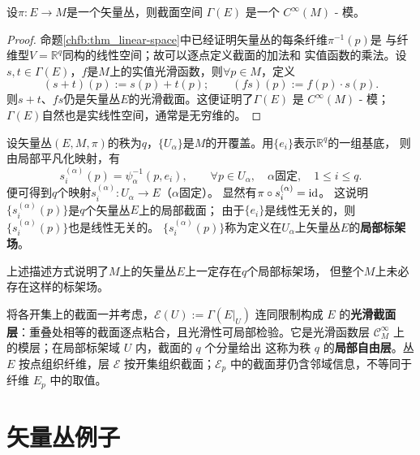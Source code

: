 \begin{proposition}
    设$\pi: E \rightarrow M$是一个矢量丛，则截面空间 $\Gamma(E)$ 是一个 $C^{\infty}(M)$ - 模。
\end{proposition}

\begin{proof}
    命题\ref{chfb:thm_linear-space}中已经证明矢量丛的每条纤维$\pi^{-1}(p)$是
    与纤维型$V = \mathbb{R}^q$同构的线性空间；故可以逐点定义截面的加法和
    实值函数的乘法。设$s,t\in \Gamma(E)$，$f$是$M$上的实值光滑函数，则$\forall p\in M$，定义
    \begin{equation}
        (s+t)(p):= s(p) + t(p);\qquad
        (fs)(p) := f(p) \cdot s(p) .
    \end{equation}
    则$s+t$、$fs$仍是矢量丛$E$的光滑截面。这便证明了$\Gamma(E)$ 是 $C^{\infty}(M)$ - 模；
    $\Gamma(E)$自然也是实线性空间，通常是无穷维的。
\end{proof}

设矢量丛$(E,M,\pi)$的秩为$q$，$\{U_\alpha\}$是$M$的开覆盖。用$\{e_i\}$表示$\mathbb{R}^q$的一组基底，
则由局部平凡化映射，有
\begin{equation}
    s_i^{(\alpha)}(p) = \psi^{-1}_{\alpha}(p, e_i),\qquad \forall p\in U_\alpha,
    \quad \alpha \text{固定}, \quad 1 \leqslant i \leqslant q.
\end{equation}
便可得到$q$个映射$s_i^{(\alpha)} : U_\alpha \to E$（$\alpha$固定）。
显然有$\pi \circ s_i^{(\alpha)} =\mathrm{id} $。
这说明$\{s_i^{(\alpha)}(p)\}$是$q$个矢量丛$E$上的局部截面；
由于$\{e_i\}$是线性无关的，则$\{s_i^{(\alpha)}(p)\}$也是线性无关的。
$\{s_i^{(\alpha)}(p)\}$称为定义在$U_\alpha$上矢量丛$E$的\textbf{局部标架场}。

上述描述方式说明了$M$上的矢量丛$E$上一定存在$q$个局部标架场，
但整个$M$上未必存在这样的标架场。

\begin{remark}\label{rem:section-sheaf}
    将各开集上的截面一并考虑，$\mathcal E(U):=\Gamma(E|_U)$ 连同限制构成 $E$ 的\textbf{光滑截面层}：重叠处相等的截面逐点粘合，且光滑性可局部检验。它是光滑函数层 $\mathcal C^\infty_M$ 上的模层；在局部标架域 $U$ 内，截面的 $q$ 个分量给出
    这称为秩 $q$ 的\textbf{局部自由层}。丛 $E$ 按点组织纤维，层 $\mathcal E$ 按开集组织截面；$\mathcal E_p$ 中的截面芽仍含邻域信息，不等同于纤维 $E_p$ 中的取值。
\end{remark}

\section{矢量丛例子}


